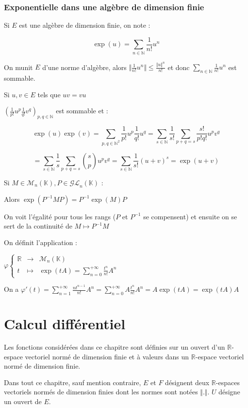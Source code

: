 \documentclass[a4paper,12pt]{book}
\newcommand{\Def}[2]{\begin{tcolorbox}[sharp corners, colback=white,colframe=blue!90!black!75, title=Définition : #1]#2\end{tcolorbox}}
\newcommand{\Prop}[2]{\begin{tcolorbox}[sharp corners, colback=white,colframe=red!90!black!75, title=Proposition : #1]#2\end{tcolorbox}}
\newcommand{\Pre}[1]{\begin{tcolorbox}[sharp corners, colback=white,colframe=green!60!green!30!black!75, title=Preuve]#1\end{tcolorbox}}
\def\R{\mathbb{R}}
\def\N{\mathbb{N}}
\def\K{\mathbb{K}}
\begin{document}
\subsection{Exponentielle dans une algèbre de dimension finie}
\Def{Exponentielle}{Si $E$ est une algèbre de dimension finie, on note :
\par $$\exp(u) = \sum\limits_{n\in\N}\frac{1}{n!}u^n$$
\par On munit $E$ d'une norme d'algèbre, alors $\Vert\frac{1}{n!}u^n\Vert \leq \frac{\Vert u\Vert^n}{n!}$ et donc $\sum\limits_{n\in\N}\frac{1}{n!}u^n$ est sommable.}
\Prop{Morphisme d'algèbre}{Si $u,v\in E$ tels que $uv = vu$
\par $\left(\frac{1}{p!}u^p\frac{1}{q!}v^q\right)_{p,q\in\N}$ est sommable et :
\par $$\exp(u)\exp(v) = \sum\limits_{p,q\in\N^2} \frac{1}{p!}u^p\frac{1}{q!}u^q = \sum\limits_{s\in\N}\frac{1}{s!}\sum\limits_{p+q=s}\frac{s!}{p!q!}u^pv^q$$
\par $$=\sum\limits_{s\in\N}\frac{1}{s}\sum\limits_{p+q=s}\binom{s}{p}u^pv^q = \sum\limits_{s\in\N}\frac{1}{s!}(u+v)^s = \exp(u+v)$$}
\Prop{Changement de base}{Si $M\in\mathcal{M}_n(\K), P\in\mathcal{GL}_n(\K)$ :
\par Alors $\exp(P^{-1}MP)=P^{-1}\exp(M)P$ }
\Pre{On voit l'égalité pour tous les rangs ($P$ et $P^{-1}$ se compensent) et ensuite on se sert de la continuité de $M\mapsto P^{-1}M$}
\Def{Série entière à coefficient matriciel}{On définit l'application :
\par $\varphi\left\{\begin{array}{rcl}\R & \to & \mathcal{M}_n(\K) \\ t & \mapsto & \exp(tA)=\sum\limits_{n=0}^{+\infty}\frac{t^n}{n!}A^n\end{array}\right.$
\par On a $\varphi'(t) = \sum\limits_{n=1}^{+\infty}\frac{nt^{n-1}}{n!}A^n = \sum\limits_{n=0}^{+\infty}A\frac{t^n}{n!}A^n = A\exp(tA) = \exp(tA)A$}

\chapter{Calcul différentiel}
Les fonctions considérées dans ce chapitre sont définies sur un ouvert d'un $\R$-espace vectoriel normé de dimension finie et à valeurs dans un  $\R$-espace vectoriel normé de dimension finie.
\par Dans tout ce chapitre, sauf mention contraire, $E$ et $F$ désignent deux $\R$-espaces vectoriels normés de dimension finies dont les normes sont notées $\Vert.\Vert$. $U$ désigne un ouvert de $E$.
\end{document}
